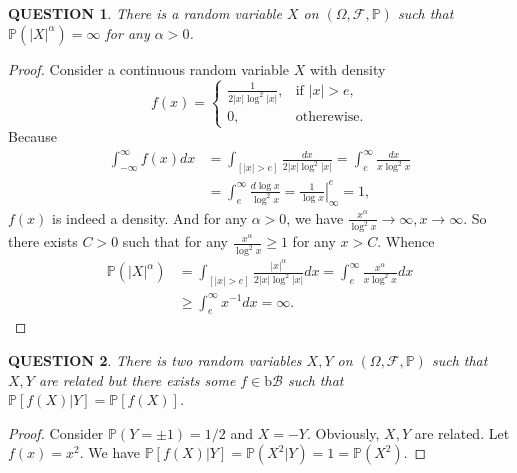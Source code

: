 \documentclass[12pt]{article}
\renewcommand{\b}{\mathscr{B}}
\renewcommand{\(}{\left(}%
\renewcommand{\)}{\right)}%
\renewcommand{\[}{\left[}%
\renewcommand{\]}{\right]}%
\newcommand{\p}{\mathbb{P}}
\newcommand{\f}{\mathscr{F}}
\newtheorem{question}{QUESTION}[section]}
\newtheorem{proof}{Proof.}}
\begin{document}
  \begin{question}
  	There is a random variable $X$ on $(\Omega,\f,\p)$ such that $\p( |X|^\alpha)=\infty$ for any $\alpha>0$. 
  \end{question}
  \begin{proof}
  	Consider a continuous random variable $X$ with density 
  	\begin{equation*}
  		f(x)=
  		\begin{cases}
  			\frac{1}{2|x|\log^2 |x|},&\mbox{if }|x|>e,\\
  			0,&\mbox{otherewise}.
  		\end{cases}
  	\end{equation*}
  	Because
  	\begin{equation*}
  		\begin{split}
  			\int_{-\infty}^\infty f(x)dx&=\int_{[|x|>e]}\frac{dx}{2|x|\log^2 |x|}=\int_e^\infty \frac{dx}{x\log^2 x}\\
  			&=\int_e^\infty \frac{d\log x}{\log^2 x}=\left.\frac{1}{\log x}\right|_{\infty}^e=1,
  		\end{split}
  	\end{equation*}
  	$f(x)$ is indeed a density. And for any $\alpha>0$, we have $\frac{x^\alpha}{\log^2 x}\to \infty,x\to\infty$. So there exists $C>0$ such that for any $\frac{x^\alpha}{\log^2 x}\geq 1$ for any $x>C$. Whence
  	\begin{equation*}
  		\begin{split}
  			\p (|X|^\alpha)&= \int_{[|x|>e]}\frac{|x|^\alpha}{2|x|\log^2 |x|}dx= \int_e^\infty \frac{x^{\alpha}}{x\log^2 x}dx\\
  			&\geq \int_e^\infty x^{-1}dx=\infty. 
  		\end{split}
  	\end{equation*}
  \end{proof}
  
  
  \begin{question}
  	There is two random variables $X,Y$ on $(\Omega,\f,\p)$ such that $X,Y$ are related but there exists some $f\in\mathrm{b}\b$ such that $\p[f(X)|Y]=\p[f(X)]$.
  \end{question}
  \begin{proof}
  	Consider $\p(Y=\pm 1)=1/2$ and $X=-Y$. Obviously, $X,Y$ are related. Let $f(x)=x^2$. We have $\p[f(X)|Y]=\p(X^2|Y)=1=\p(X^2)$.
  \end{proof}
  
\end{document}
